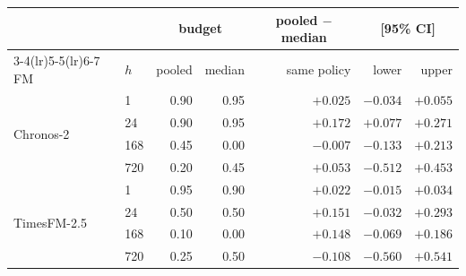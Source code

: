 \begin{tabular}{llrrrrr}
\toprule
 &  & \multicolumn{2}{c}{budget} & \multicolumn{1}{c}{pooled $-$ median} & \multicolumn{2}{c}{[95\% CI]} \\
\cmidrule(lr){3-4}\cmidrule(lr){5-5}\cmidrule(lr){6-7}
FM & $h$ & pooled & median & same policy & lower & upper \\
\midrule
\multirow{4}{*}{Chronos-2}
 & 1 & 0.90 & 0.95 & $+0.025$ & $-0.034$ & $+0.055$ \\
 & 24 & 0.90 & 0.95 & $+0.172$ & $+0.077$ & $+0.271$ \\
 & 168 & 0.45 & 0.00 & $-0.007$ & $-0.133$ & $+0.213$ \\
 & 720 & 0.20 & 0.45 & $+0.053$ & $-0.512$ & $+0.453$ \\
\midrule
\multirow{4}{*}{TimesFM-2.5}
 & 1 & 0.95 & 0.90 & $+0.022$ & $-0.015$ & $+0.034$ \\
 & 24 & 0.50 & 0.50 & $+0.151$ & $-0.032$ & $+0.293$ \\
 & 168 & 0.10 & 0.00 & $+0.148$ & $-0.069$ & $+0.186$ \\
 & 720 & 0.25 & 0.50 & $-0.108$ & $-0.560$ & $+0.541$ \\
\bottomrule
\end{tabular}
